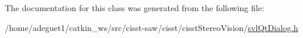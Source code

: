 The documentation for this class was generated from the following file\-:\begin{DoxyCompactItemize}
\item 
/home/adeguet1/catkin\-\_\-ws/src/cisst-\/saw/cisst/cisst\-Stereo\-Vision/\hyperlink{svl_qt_dialog_8h}{svl\-Qt\-Dialog.\-h}\end{DoxyCompactItemize}
